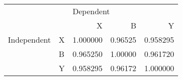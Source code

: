 \begin{tabular}{llrrr}
\toprule
            &   & \multicolumn{3}{l}{Dependent} \\
            &   &         X &        B &         Y \\
\midrule
Independent & X &  1.000000 &  0.96525 &  0.958295 \\
            & B &  0.965250 &  1.00000 &  0.961720 \\
            & Y &  0.958295 &  0.96172 &  1.000000 \\
\bottomrule
\end{tabular}
